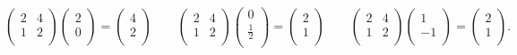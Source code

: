 \begin{equation*}
    \begin{pmatrix}
        2 & 4 \\
        1 & 2 \\
    \end{pmatrix}
    \begin{pmatrix}
        2 \\
        0 \\
    \end{pmatrix} = 
    \begin{pmatrix}
        4 \\
        2 \\
    \end{pmatrix}\quad  \quad
    \begin{pmatrix}
        2 & 4 \\
        1 & 2 \\
    \end{pmatrix}
    \begin{pmatrix}
        0 \\
        \frac{1}{2} \\
    \end{pmatrix} = 
    \begin{pmatrix}
        2 \\
        1 \\
    \end{pmatrix}\quad  \quad
    \begin{pmatrix}
        2 & 4 \\
        1 & 2 \\
    \end{pmatrix}
    \begin{pmatrix}
        1 \\
        -1 \\
    \end{pmatrix} = 
    \begin{pmatrix}
        2 \\
        1 \\
    \end{pmatrix}.
\end{equation*}



